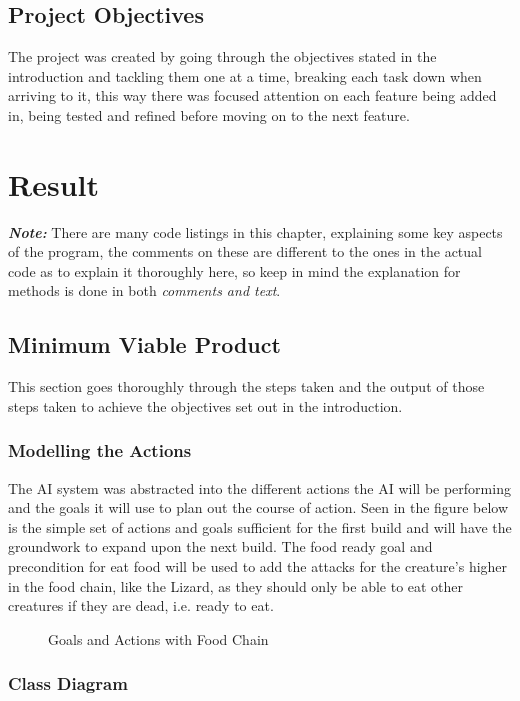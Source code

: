 \documentclass[11pt]{report}
\begin{document}
\section{Project Objectives}
The project was created by going through the objectives stated in the introduction and tackling them one at a time, breaking each task down when arriving to it, this way there was focused attention on each feature being added in, being tested and refined before moving on to the next feature.

\chapter{Result}

\textit{\textbf{Note:}} There are many code listings in this chapter, explaining some key aspects of the program, the comments on these are different to the ones in the actual code as to explain it thoroughly here, so keep in mind the explanation for methods is done in both \textit{comments and text}.

\section{Minimum Viable Product}
This section goes thoroughly through the steps taken and the output of those steps taken to achieve the objectives set out in the introduction.
\subsection{Modelling the Actions}
The AI system was abstracted into the different actions the AI will be performing and the goals it will use to plan out the course of action. Seen in the figure below is the simple set of actions and goals sufficient for the first build and will have the groundwork to expand upon the next build. The food ready goal and precondition for eat food will be used to add the attacks for the creature's higher in the food chain, like the Lizard, as they should only be able to eat other creatures if they are dead, i.e. ready to eat.

\begin{figure}[H]
    \centering
    \caption{Goals and Actions with Food Chain}
\end{figure}

\subsection{Class Diagram}
\end{document}
